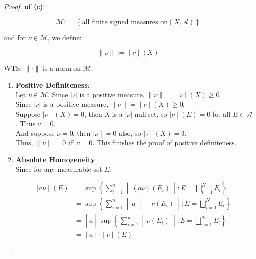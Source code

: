 \begin{proof}

\textbf{of (c)}:

\[\mathcal{M}: = \left\{ {\text{all finite signed measures on}(X,\mathcal{A})} \right\}\]

and for \(\nu \in \mathcal{M}\), we define:

\[\left. \parallel \nu \parallel := \middle| \nu \middle| (X) \right.\]

WTS: \(\parallel \cdot \parallel\) is a norm on \(\mathcal{M}\).\\

\begin{enumerate}
\item
  \textbf{Positive Definiteness}:\\
  Let \(\nu \in \mathcal{M}\). Since \(|\nu|\) is a positive measure, \(\left. \parallel \nu \parallel = \middle| \nu \middle| (X) \geq 0 \right.\).\\
  Since \(|\nu|\) is a positive measure, \(\left. \parallel \nu \parallel = \middle| \nu \middle| (X) \geq 0 \right.\).\\
  Suppose \(\left. |\nu \middle| (X) = 0 \right.\), then \(X\) is a \(|\nu|\)-null set, so \(\left. |\nu \middle| (E) = 0 \right.\) for all \(E \in \mathcal{A}\). Thus \(\nu = 0\).\\
  And suppose \(\nu = 0\), then \(\left. |\nu \middle| = 0 \right.\) also, so \(\left. |\nu \middle| (X) = 0 \right.\).\\
  Thus, \(\parallel \nu \parallel = 0\) iff \(\nu = 0\). This finishes the proof of positive definiteness.
\item
  \textbf{Absolute Homogeneity}:\\
  Since for any measurable set \(E\):

  \[\begin{matrix}
  \left. |a\nu \middle| (E) \right. & {= \sup\left\{ \sum\limits_{i = 1}^{n} \middle| \ (a\nu)(E_{i})\  \middle| :E = \bigsqcup\limits_{i = 1}^{N}E_{i} \right\}} \\
   & {= \sup\left\{ \sum\limits_{i = 1}^{n} \middle| \ a\  \middle| \  \middle| \ \nu(E_{i})\  \middle| :E = \bigsqcup\limits_{i = 1}^{N}E_{i} \right\}} \\
   & \left. = \middle| a \middle| \sup\left\{ \sum\limits_{i = 1}^{n} \middle| \ \nu(E_{i})\  \middle| :E = \bigsqcup\limits_{i = 1}^{N}E_{i} \right\} \right. \\
   & \left. = \middle| a \middle| \cdot \middle| \nu \middle| (E) \right.
  \end{matrix}\]


\end{enumerate}
\end{proof}
